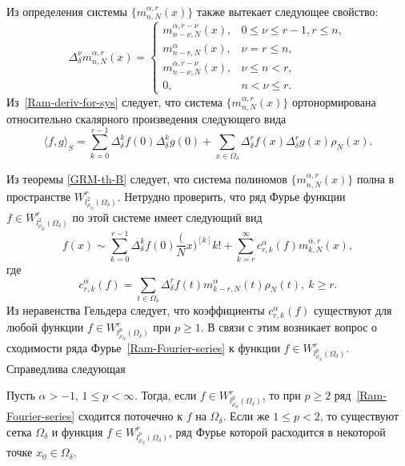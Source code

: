Из определения системы $\{m_{n,N}^{\alpha,r}(x)\}$ также вытекает следующее свойство:
\begin{equation}\label{Ram-deriv-for-sys}
\Delta_\delta^\nu m_{n,N}^{\alpha,r}(x)=
\begin{cases}
m_{n-\nu,N}^{\alpha,r-\nu}(x),& 0\le\nu\le r-1, r\le n,\\
m_{n-r,N}^{\alpha}(x),& \nu=r\le n,\\
m_{n-\nu,N}^{\alpha,r-\nu}(x),& \nu\le n<r,\\
0,& n<\nu\le r.
\end{cases}
\end{equation}
Из~\eqref{Ram-deriv-for-sys} следует, что система $\{m_{n,N}^{\alpha,r}(x)\}$ ортонормирована относительно скалярного произведения следующего вида
\begin{equation*}
\langle f,g\rangle_S=\sum_{k=0}^{r-1}\Delta_\delta^kf(0)\Delta_\delta^kg(0)+\sum_{x\in\Omega_\delta}\Delta_\delta^rf(x)\Delta_\delta^rg(x)\rho_N(x).
\end{equation*}

Из теоремы \ref{GRM-th-B} следует, что система полиномов $\{m_{n,N}^{\alpha,r}(x)\}$ полна в пространстве $W^r_{l^2_{\rho_N}(\Omega_\delta)}$. Нетрудно проверить, что ряд Фурье функции $f\in W^r_{l^2_{\rho_N}(\Omega_\delta)}$ по этой системе имеет следующий вид
\begin{equation}\label{Ram-Fourier-series}
f(x)\sim \sum_{k=0}^{r-1}\Delta_\delta^kf(0){\frac(Nx)^{[k]}{k!}}+\sum_{k=r}^\infty c^\alpha_{r,k}(f)m^{\alpha,r}_{k,N}(x),
\end{equation}
где
\begin{equation*}
c^\alpha_{r,k}(f)=\sum_{t\in\Omega_\delta}\Delta_\delta^r f(t)m^\alpha_{k-r,N}(t)\rho_N(t),\ k\ge r.
\end{equation*}
Из неравенства Гельдера следует, что коэффициенты $c^\alpha_{r,k}(f)$ существуют для любой функции $f\in W^r_{l^p_{\rho_N}(\Omega_\delta)}$ при $p\ge 1$. В связи с этим возникает вопрос о сходимости ряда Фурье~\eqref{Ram-Fourier-series} к функции $f\in W^r_{l^p_{\rho_N}(\Omega_\delta)}$. Справедлива следующая
\begin{theorem}\label{Ram-theoMex1}
Пусть $\alpha>-1$, $1\le p<\infty$. Тогда, если $f\in W^r_{l^p_{\rho_N}(\Omega_\delta)}$, то при $p\ge2$ ряд~\eqref{Ram-Fourier-series} сходится поточечно к $f$ на $\Omega_\delta$. Если же $1\le p<2$, то существуют сетка $\Omega_\delta$ и функция $f\in W^r_{l^p_{\rho_N}(\Omega_\delta)}$, ряд Фурье которой расходится в некоторой точке $x_0\in \Omega_\delta$.
\end{theorem}


